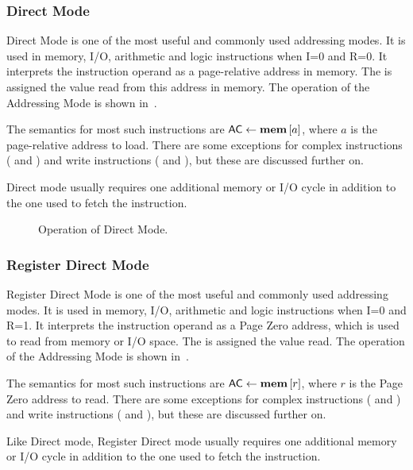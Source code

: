 \subsubsection{Direct Mode}
\label{sec:direct-mode}

Direct Mode is one of the most useful and commonly used addressing modes. It is
used in memory, I/O, arithmetic and logic instructions when I=0 and R=0. It
interprets the instruction operand as a page-relative address in memory. The
\AC{} is assigned the value read from this address in memory. The operation of
the \gls{Addressing Mode} is shown in~.

The semantics for most such instructions are $\mbox{\AC}\eq\mem{a}$, where $a$
is the page-relative address to load. There are some exceptions for complex
instructions ( and ) and write instructions ( and
), but these are discussed further on.

Direct mode usually requires one additional memory or I/O cycle in addition to
the one used to fetch the instruction.

\begin{figure}[htb]
 \centering
 
\caption[Direct Mode]{\label{fig:direct-mode} Operation of Direct Mode.}
\end{figure}


\subsubsection{Register Direct Mode}
\label{sec:register-direct-mode}

Register Direct Mode is one of the most useful and commonly used addressing
modes. It is used in memory, I/O, arithmetic and logic instructions when I=0
and R=1. It interprets the instruction operand as a \gls{Page Zero} address,
which is used to read from memory or I/O space. The \AC{} is assigned the value
read. The operation of the \gls{Addressing Mode} is shown
in~.

The semantics for most such instructions are $\mbox{\AC}\eq\mem{r}$, where $r$
is the Page Zero address to read. There are some exceptions for complex
instructions ( and ) and write instructions ( and
), but these are discussed further on.

Like Direct mode, Register Direct mode usually requires one additional memory
or I/O cycle in addition to the one used to fetch the instruction.

